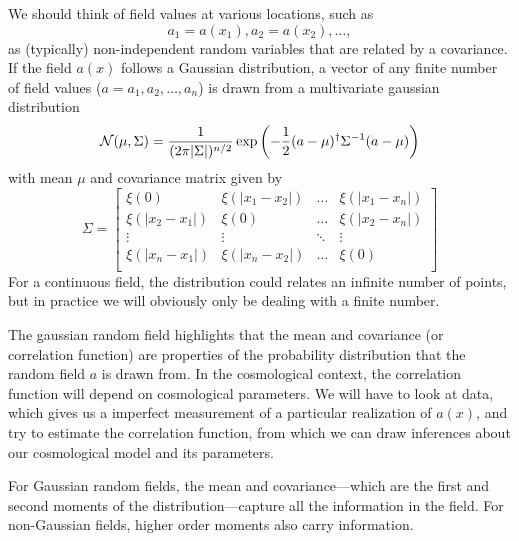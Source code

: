 We should think of field values at various locations, such as 
\begin{equation}a_1 = a(x_1), a_2 = a(x_2), \dots, \end{equation}
as (typically) non-independent random variables that are related by a covariance.  If the field $a(x)$ follows a Gaussian distribution, a vector of any finite number of field values ($a = a_1,a_2,\dots,a_n$) is drawn from a multivariate gaussian distribution
\begin{equation}
  {\cal N}(\mu, \Sigma) = \frac{1}{(2\pi|\Sigma|)^{n/2}} \exp \left( -\frac{1}{2} (a - \mu)^\dag \Sigma^{-1} (a-\mu) \right)
\end{equation}
with mean $\mu$ and covariance matrix given by
\begin{equation}
  \Sigma = \left[ \begin{array}{cccc}
    \xi(0) & \xi(|x_1-x_2|) & \dots & \xi(|x_1-x_n|) \\
    \xi(|x_2-x_1|) & \xi(0) & \dots & \xi(|x_2-x_n|) \\
    \vdots & \vdots & \ddots & \vdots \\
    \xi(|x_n-x_1|) & \xi(|x_n-x_2|) & \dots & \xi(0) \\    
    \end{array} \right]
\end{equation}
For a continuous field, the distribution could relates an infinite number of points, but in practice we will obviously only be dealing with a finite number.

The gaussian random field highlights that the mean and covariance (or correlation function) are properties of the probability distribution that the random field $a$ is drawn from.  In the cosmological context, the correlation function will depend on cosmological parameters.  We will have to look at data, which gives us a imperfect measurement of a particular realization of $a(x)$, and try to estimate the correlation function, from which we can draw inferences about our cosmological model and its parameters.

For Gaussian random fields, the mean and covariance---which are the first and second moments of the distribution---capture all the information in the field.  For non-Gaussian fields, higher order moments also carry information.

